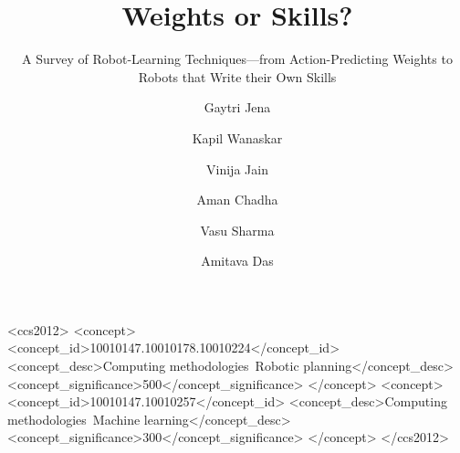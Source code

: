 \documentclass[acmsmall,screen,nonacm]{acmart}
\begin{document}
\title{Weights or Skills?}
\subtitle{A Survey of Robot-Learning Techniques---from Action-Predicting
  Weights to Robots that Write their Own Skills}

\author{Gaytri Jena}
\author{Kapil Wanaskar}
\author{Vinija Jain}
\author{Aman Chadha}
\author{Vasu Sharma}
\author{Amitava Das}

\renewcommand{\shortauthors}{Jena et al.}



\begin{CCSXML}
<ccs2012>
   <concept>
       <concept_id>10010147.10010178.10010224</concept_id>
       <concept_desc>Computing methodologies~Robotic planning</concept_desc>
       <concept_significance>500</concept_significance>
   </concept>
   <concept>
       <concept_id>10010147.10010257</concept_id>
       <concept_desc>Computing methodologies~Machine learning</concept_desc>
       <concept_significance>300</concept_significance>
   </concept>
</ccs2012>
\end{CCSXML}


\maketitle

















\end{document}
